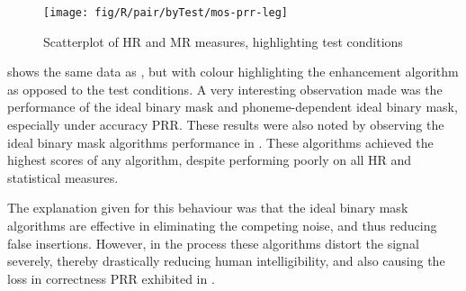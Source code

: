 \begin{figure}[h]


\noindent \begin{centering}
\texttt{[image: fig/R/pair/byTest/mos-prr-leg]}
\par\end{centering}

\protect\caption{\label{fig:hr-mr}Scatterplot of \acs{HR} and \acs{MR} measures,
highlighting test conditions}
\end{figure}


 shows the same data as , but with
colour highlighting the enhancement algorithm as opposed to the test
conditions. A very interesting observation made was the performance
of the ideal binary mask and phoneme-dependent ideal binary mask,
especially under accuracy \ac{PRR}. These results were also noted
by observing the ideal binary mask algorithms performance in .
These algorithms achieved the highest scores of any algorithm, despite
performing poorly on all \ac{HR} and statistical measures.

The explanation given for this behaviour was that the ideal binary
mask algorithms are effective in eliminating the competing noise,
and thus reducing false insertions. However, in the process these
algorithms distort the signal severely, thereby drastically reducing
human intelligibility, and also causing the loss in correctness \ac{PRR}
exhibited in . 

